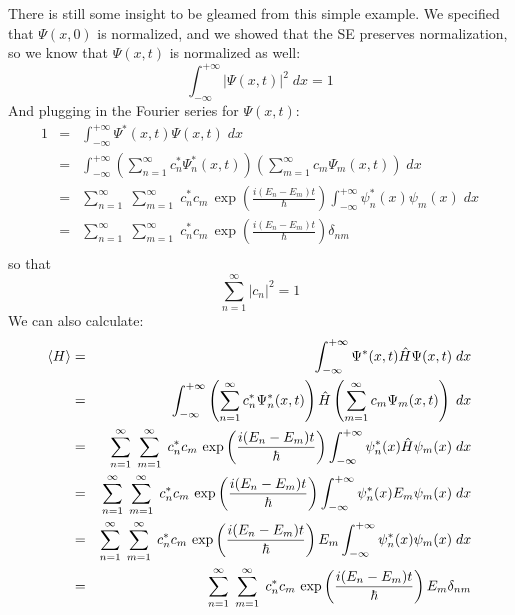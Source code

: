 \documentclass[12pt]{book}
\begin{document}
There is still some insight to be gleamed from this simple example.  We specified that $\Psi(x,0)$ is normalized, and we showed that the SE preserves normalization, so we know that $\Psi(x,t)$ is normalized as well:
\begin{equation*}
\int_{-\infty}^{+\infty} |\Psi(x,t)|^2 \; dx = 1
\end{equation*}
And plugging in the Fourier series for $\Psi(x,t)$:
\begin{eqnarray*}
1 &=& \int_{-\infty}^{+\infty} \Psi^*(x,t)\Psi(x,t) \; dx \\
  &=& \int_{-\infty}^{+\infty} \left( \sum_{n=1}^{\infty} c_n^* \Psi_n^*(x,t) \right) \left( \sum_{m=1}^{\infty} c_m \Psi_m(x,t) \right) \; dx \\
  &=& \sum_{n=1}^{\infty} \; \sum_{m=1}^{\infty} \; c_n^* c_m  \, \exp\left(\frac{i(E_n-E_m)t}{\hbar}\right) \int_{-\infty}^{+\infty} \psi_n^*(x) \psi_m(x) \; dx \\
  &=& \sum_{n=1}^{\infty} \; \sum_{m=1}^{\infty} \; c_n^* c_m  \, \exp\left(\frac{i(E_n-E_m)t}{\hbar}\right) \delta_{nm} \\
\end{eqnarray*}
so that  
\begin{equation}  
\sum_{n=1}^{\infty} |c_n|^2 = 1
\end{equation}
We can also calculate:
\begin{eqnarray*}
\braket{H} &=& \int_{-\infty}^{+\infty} \Psi^*(x,t)\hat{H}\Psi(x,t) \; dx \\
  &=& \int_{-\infty}^{+\infty} \left( \sum_{n=1}^{\infty} c_n^* \Psi_n^*(x,t) \right) \hat{H}\left( \sum_{m=1}^{\infty} c_m \Psi_m(x,t) \right) \; dx \\
  &=& \sum_{n=1}^{\infty} \; \sum_{m=1}^{\infty} \; c_n^* c_m \, \exp\left(\frac{i(E_n-E_m)t}{\hbar}\right) \int_{-\infty}^{+\infty} \psi_n^*(x) \hat{H} \psi_m(x) \; dx \\
  &=& \sum_{n=1}^{\infty} \; \sum_{m=1}^{\infty} \; c_n^* c_m \, \exp\left(\frac{i(E_n-E_m)t}{\hbar}\right) \int_{-\infty}^{+\infty} \psi_n^*(x) E_m \psi_m(x) \; dx \\
  &=& \sum_{n=1}^{\infty} \; \sum_{m=1}^{\infty} \; c_n^* c_m \, \exp\left(\frac{i(E_n-E_m)t}{\hbar}\right) E_m \int_{-\infty}^{+\infty} \psi_n^*(x) \psi_m(x) \; dx \\
  &=& \sum_{n=1}^{\infty} \; \sum_{m=1}^{\infty} \; c_n^* c_m  \, \exp\left(\frac{i(E_n-E_m)t}{\hbar}\right) E_m \delta_{nm} \\
\end{eqnarray*}
\end{document}
